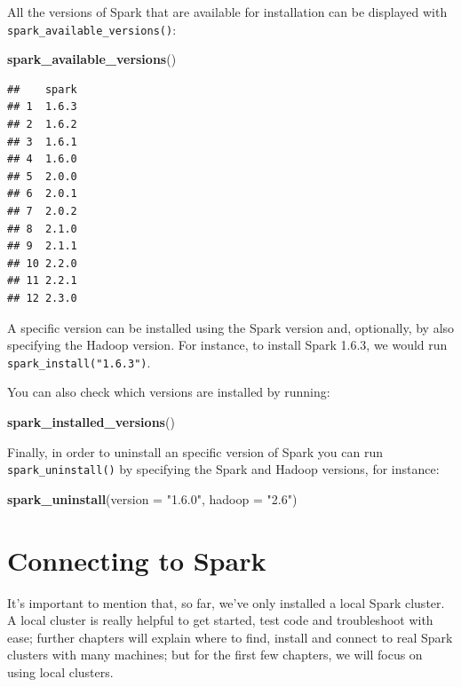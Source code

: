 \documentclass[]{book}
\newenvironment{Shaded}{\begin{snugshade}}{\end{snugshade}}
\newcommand{\DataTypeTok}[1]{\textcolor[rgb]{0.13,0.29,0.53}{#1}}
\newcommand{\KeywordTok}[1]{\textcolor[rgb]{0.13,0.29,0.53}{\textbf{#1}}}
\newcommand{\NormalTok}[1]{#1}
\newcommand{\StringTok}[1]{\textcolor[rgb]{0.31,0.60,0.02}{#1}}
\theoremstyle{definition}
\theoremstyle{definition}
\theoremstyle{definition}
\theoremstyle{remark}
\begin{document}
All the versions of Spark that are available for installation can be
displayed with \texttt{spark\_available\_versions()}:

\begin{Shaded}
\begin{Highlighting}[]
\KeywordTok{spark_available_versions}\NormalTok{()}
\end{Highlighting}
\end{Shaded}

\begin{verbatim}
##    spark
## 1  1.6.3
## 2  1.6.2
## 3  1.6.1
## 4  1.6.0
## 5  2.0.0
## 6  2.0.1
## 7  2.0.2
## 8  2.1.0
## 9  2.1.1
## 10 2.2.0
## 11 2.2.1
## 12 2.3.0
\end{verbatim}

A specific version can be installed using the Spark version and,
optionally, by also specifying the Hadoop version. For instance, to
install Spark 1.6.3, we would run \texttt{spark\_install("1.6.3")}.

You can also check which versions are installed by running:

\begin{Shaded}
\begin{Highlighting}[]
\KeywordTok{spark_installed_versions}\NormalTok{()}
\end{Highlighting}
\end{Shaded}

Finally, in order to uninstall an specific version of Spark you can run
\texttt{spark\_uninstall()} by specifying the Spark and Hadoop versions,
for instance:

\begin{Shaded}
\begin{Highlighting}[]
\KeywordTok{spark_uninstall}\NormalTok{(}\DataTypeTok{version =} \StringTok{"1.6.0"}\NormalTok{, }\DataTypeTok{hadoop =} \StringTok{"2.6"}\NormalTok{)}
\end{Highlighting}
\end{Shaded}

\hypertarget{connecting-to-spark}{%
\section{Connecting to Spark}\label{connecting-to-spark}}

It's important to mention that, so far, we've only installed a local
Spark cluster. A local cluster is really helpful to get started, test
code and troubleshoot with ease; further chapters will explain where to
find, install and connect to real Spark clusters with many machines; but
for the first few chapters, we will focus on using local clusters.
\end{document}
